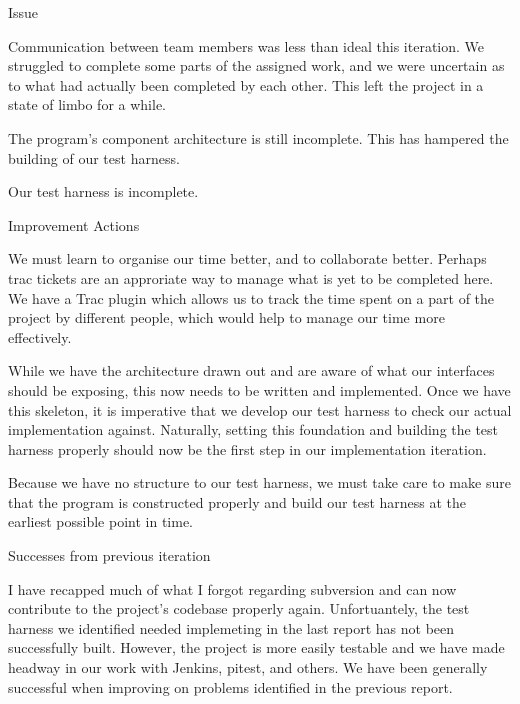 Issue

Communication between team members was less than ideal this iteration. We struggled to complete some parts of the assigned work, and we were uncertain as to what had actually been completed by each other. This left the project in a state of limbo for a while.

The program's component architecture is still incomplete. This has hampered the building of our test harness.

Our test harness is incomplete.


Improvement Actions

We must learn to organise our time better, and to collaborate better. Perhaps trac tickets are an approriate way to manage what is yet to be completed here. We have a Trac plugin which allows us to track the time spent on a part of the project by different people, which would help to manage our time more effectively.

While we have the architecture drawn out and are aware of what our interfaces should be exposing, this now needs to be written and implemented. Once we have this skeleton, it is imperative that we develop our test harness to check our actual implementation against. Naturally, setting this foundation and building the test harness properly should now be the first step in our implementation iteration.

Because we have no structure to our test harness, we must take care to make sure that the program is constructed properly and build our test harness at the earliest possible point in time.


Successes from previous iteration

I have recapped much of what I forgot regarding subversion and can now contribute to the project's codebase properly again. 
Unfortuantely, the test harness we identified needed implemeting in the last report has not been successfully built. However, the project is more easily testable and we have made headway in our work with Jenkins, pitest, and others. 
We have been generally successful when improving on problems identified in the previous report.
